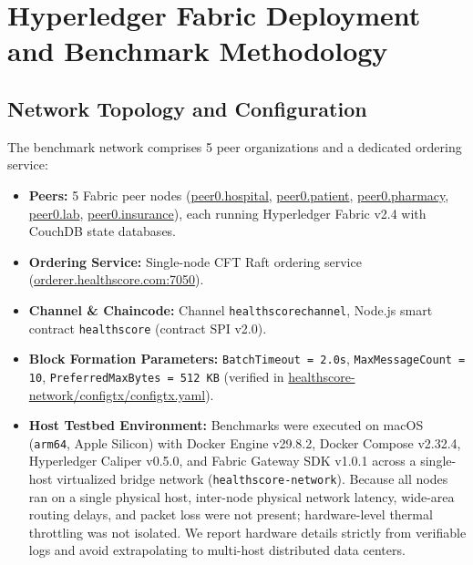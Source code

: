 \documentclass[runningheads]{llncs}
\begin{document}
\section{Hyperledger Fabric Deployment and Benchmark Methodology}

\subsection{Network Topology and Configuration}
The benchmark network comprises 5 peer organizations and a dedicated ordering service:
\begin{itemize}
    \item \textbf{Peers:} 5 Fabric peer nodes (\url{peer0.hospital}, \url{peer0.patient}, \url{peer0.pharmacy}, \url{peer0.lab}, \url{peer0.insurance}), each running Hyperledger Fabric v2.4 with CouchDB state databases.
    \item \textbf{Ordering Service:} Single-node CFT Raft ordering service (\url{orderer.healthscore.com:7050}).
    \item \textbf{Channel \& Chaincode:} Channel \texttt{healthscorechannel}, Node.js smart contract \texttt{healthscore} (contract SPI v2.0).
    \item \textbf{Block Formation Parameters:} \texttt{BatchTimeout = 2.0s}, \texttt{MaxMessageCount = 10}, \texttt{PreferredMaxBytes = 512 KB} (verified in \url{healthscore-network/configtx/configtx.yaml}).
    \item \textbf{Host Testbed Environment:} Benchmarks were executed on macOS (\texttt{arm64}, Apple Silicon) with Docker Engine v29.8.2, Docker Compose v2.32.4, Hyperledger Caliper v0.5.0, and Fabric Gateway SDK v1.0.1 across a single-host virtualized bridge network (\texttt{healthscore-network}). Because all nodes ran on a single physical host, inter-node physical network latency, wide-area routing delays, and packet loss were not present; hardware-level thermal throttling was not isolated. We report hardware details strictly from verifiable logs and avoid extrapolating to multi-host distributed data centers.
\end{itemize}
\end{document}
